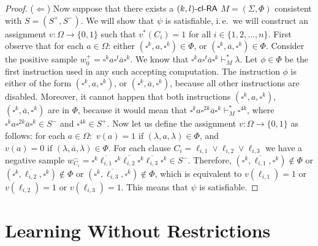 \begin{proof}
($\Leftarrow$)
Now suppose that there exists a $\textup{\sf $(k,l)$-\textup{\sf cl-RA\/}}$ $M = (\Sigma, \Phi)$ consistent with $S = (S^+, S^-)$. We will show that $\psi$ is satisfiable, i.\,e.\ we will construct an assignment $v: \Omega \to \{0, 1\}$ such that $v^*(C_i) = 1$ for all $i \in \{1, 2, \ldots, n\}$. First observe that for each $a \in \Omega$: either $(\square^k, a, \square^k) \in \Phi$, or $(\square^k, \overline{a}, \square^k) \in \Phi$. Consider the positive sample $w_0^+ = \square^k a \square^t \overline{a} \square^k$. We know that $\square^k a \square^t \overline{a} \square^k \vdash_M^* \lambda$. Let $\phi \in \Phi$ be the first instruction used in any such accepting computation. The instruction $\phi$ is either of the form $(\square^k, a, \square^k)$, or $(\square^k, \overline{a}, \square^k)$, because all other instructions are disabled. Moreover, it cannot happen that both instructions $(\square^k, a, \square^k)$, $(\square^k, \overline{a}, \square^k)$ are in $\Phi$, because it would mean that $\square^k a \square^{2k} \overline{a} \square^k \vdash_M^* \square^{4k}$, where $\square^k a \square^{2k} \overline{a} \square^k \in S^-$ and $\square^{4k} \in S^+$. Now let us define the assignment $v: \Omega \to \{0, 1\}$ as follows: for each $a \in \Omega:$ $v(a) = 1 \text{ if } (\lambda, a, \lambda) \in \Phi$, and $v(a) = 0 \text{ if } (\lambda, \overline{a}, \lambda) \in \Phi$. For each clause $C_i = \ell_{i,1} \vee \ell_{i,2} \vee \ell_{i,3}$ we have a negative sample $w_{C_i}^- = \square^k \overline{\ell_{i,1}} \square^k \overline{\ell_{i,2}} \square^k \overline{\ell_{i,3}} \square^k \in S^-$. Therefore, $(\square^k, \overline{\ell_{i,1}}, \square^k) \notin \Phi$ or $(\square^k, \overline{\ell_{i,2}}, \square^k) \notin \Phi$ or $(\square^k, \overline{\ell_{i,3}}, \square^k) \notin \Phi$, which is equivalent to $v(\ell_{i,1}) = 1$ or $v(\ell_{i,2}) = 1$ or $v(\ell_{i,3}) = 1$. This means that $\psi$ is satisfiable.
\end{proof}

\section{Learning Without Restrictions}\label{section:unrestricted-learning}

